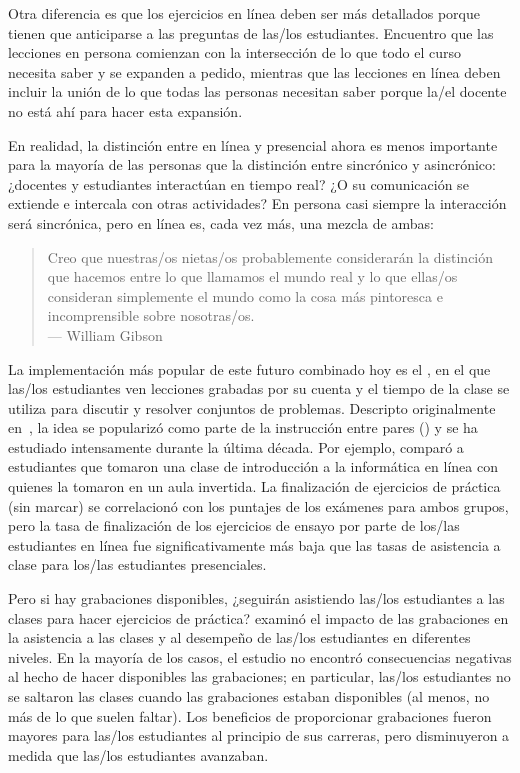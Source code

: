 Otra diferencia es que
los ejercicios en línea deben ser más detallados
porque tienen que anticiparse a las preguntas de las/los estudiantes.
Encuentro que las lecciones en persona comienzan con la intersección de lo que todo el curso necesita saber y se expanden a pedido,
mientras que las lecciones en línea deben incluir la unión de lo que todas las personas necesitan saber
porque la/el docente no está ahí para hacer esta expansión.

En realidad,
la distinción entre en línea y presencial ahora es menos importante para la mayoría de las personas
que la distinción entre sincrónico y asincrónico:
¿docentes y estudiantes interactúan en tiempo real?
¿O su comunicación se extiende e intercala con otras actividades?
En persona casi siempre la interacción será sincrónica,
pero en línea es, cada vez más, una mezcla de ambas:

\begin{quote}

  Creo que nuestras/os nietas/os probablemente considerarán la distinción que hacemos
  entre lo que llamamos el mundo real y lo que ellas/os consideran simplemente el mundo
  como la cosa más pintoresca e incomprensible sobre nosotras/os. \\
  --- William Gibson

\end{quote}

La implementación más popular de este futuro combinado hoy
es el ,
en el que las/los estudiantes ven lecciones grabadas por su cuenta
y el tiempo de la clase se utiliza para discutir y resolver conjuntos de problemas.
Descripto originalmente en~\cite{King1993},
la idea se popularizó como parte de la instrucción entre pares ()
y se ha estudiado intensamente durante la última década.
Por ejemplo,
\cite{Camp2016} comparó a estudiantes que tomaron una clase de introducción a la informática en línea
con quienes la tomaron en un aula invertida.
La finalización de ejercicios de práctica (sin marcar) se correlacionó con los puntajes de los exámenes para ambos grupos,
pero la tasa de finalización de los ejercicios de ensayo por parte de los/las estudiantes en línea
fue significativamente más baja que las tasas de asistencia a clase para los/las estudiantes presenciales.

Pero si hay grabaciones disponibles,
¿seguirán asistiendo las/los estudiantes a las clases para hacer ejercicios de práctica?
\cite{Nord2017} examinó el impacto de las grabaciones en la asistencia a las clases
y al desempeño de las/los estudiantes en diferentes niveles.
En la mayoría de los casos, el estudio no encontró consecuencias negativas al hecho de hacer disponibles las grabaciones;
en particular,
las/los estudiantes no se saltaron las clases cuando las grabaciones estaban disponibles
(al menos, no más de lo que suelen faltar).
Los beneficios de proporcionar grabaciones fueron mayores para las/los estudiantes al principio de sus carreras,
pero disminuyeron a medida que las/los estudiantes avanzaban.

